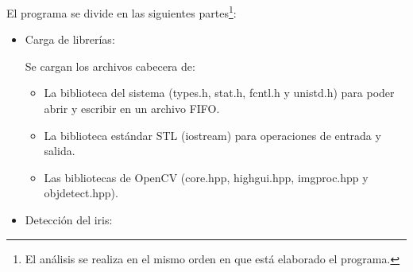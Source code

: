 El programa se divide en las siguientes partes\footnote{El análisis se realiza en el mismo orden en que está elaborado el programa.}:

\begin{itemize}

    \item Carga de librerías: 



    
    Se cargan los archivos cabecera de:
    \begin{itemize}
        \item La biblioteca del sistema (types.h, stat.h, fcntl.h y unistd.h) para poder abrir y escribir en un archivo FIFO.
        \item La biblioteca estándar STL (iostream) para operaciones de entrada y salida.
        \item Las bibliotecas de OpenCV (core.hpp, highgui.hpp, imgproc.hpp y objdetect.hpp).
    \end{itemize}
    
\clearpage
   \item Detección del iris:


\end{itemize}
